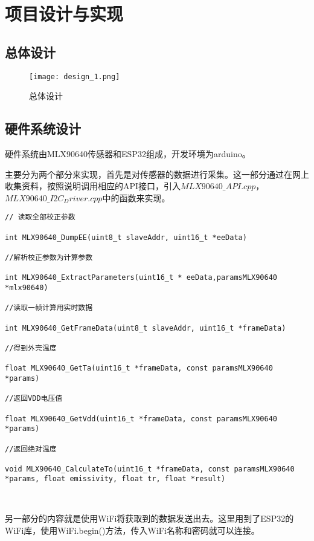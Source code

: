 \chapter{项目设计与实现}
\section{总体设计}
\begin{figure}[htbp]
    \centering
    \texttt{[image: design\_1.png]}
    \caption{总体设计}\label{fig:design_1}
    \vspace{\baselineskip}
    \end{figure}


\section{硬件系统设计}
硬件系统由MLX90640传感器和ESP32组成，开发环境为arduino。

主要分为两个部分来实现，首先是对传感器的数据进行采集。这一部分通过在网上收集资料，按照说明调用相应的API接口，引入$MLX90640\_API.cpp$，$MLX90640\_I2C_Driver.cpp$中的函数来实现。

\begin{lstlisting} 
// 读取全部校正参数
    
int MLX90640_DumpEE(uint8_t slaveAddr, uint16_t *eeData) 
    
//解析校正参数为计算参数
    
int MLX90640_ExtractParameters(uint16_t * eeData,paramsMLX90640 *mlx90640) 
    
//读取一帧计算用实时数据
    
int MLX90640_GetFrameData(uint8_t slaveAddr, uint16_t *frameData) 
    
//得到外壳温度
    
float MLX90640_GetTa(uint16_t *frameData, const paramsMLX90640 *params)
    
//返回VDD电压值
   
float MLX90640_GetVdd(uint16_t *frameData, const paramsMLX90640 *params)
    
//返回绝对温度
   
void MLX90640_CalculateTo(uint16_t *frameData, const paramsMLX90640 *params, float emissivity, float tr, float *result)
    
    
\end{lstlisting}

另一部分的内容就是使用WiFi将获取到的数据发送出去。这里用到了ESP32的WiFi库，使用WiFi.begin()方法，传入WiFi名称和密码就可以连接。

